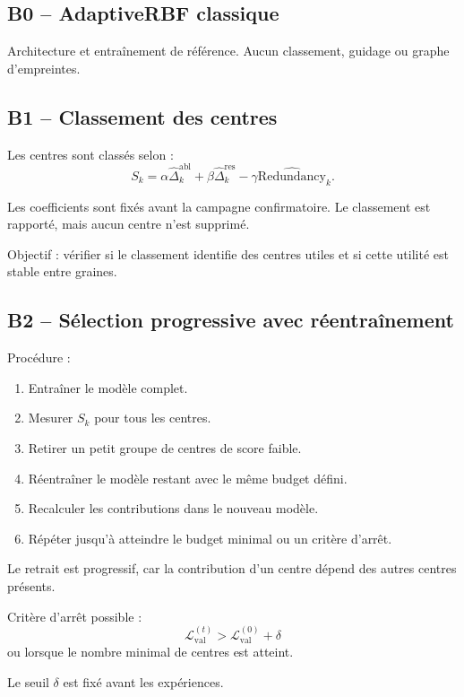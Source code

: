 \documentclass[11pt,a4paper]{article}
\begin{document}
\subsection{B0 -- AdaptiveRBF classique}

Architecture et entraînement de référence.
Aucun classement, guidage ou graphe d'empreintes.

\subsection{B1 -- Classement des centres}

Les centres sont classés selon :
\[
S_k=
\alpha\widehat{\Delta}_k^{\mathrm{abl}}
+\beta\widehat{\Delta}_k^{\mathrm{res}}
-\gamma\widehat{\mathrm{Redundancy}}_k.
\]

Les coefficients sont fixés avant la campagne confirmatoire.
Le classement est rapporté, mais aucun centre n'est supprimé.

Objectif : vérifier si le classement identifie des centres utiles
et si cette utilité est stable entre graines.

\subsection{B2 -- Sélection progressive avec réentraînement}

Procédure :

\begin{enumerate}
  \item Entraîner le modèle complet.
  \item Mesurer \(S_k\) pour tous les centres.
  \item Retirer un petit groupe de centres de score faible.
  \item Réentraîner le modèle restant avec le même budget défini.
  \item Recalculer les contributions dans le nouveau modèle.
  \item Répéter jusqu'à atteindre le budget minimal ou un critère d'arrêt.
\end{enumerate}

Le retrait est progressif, car la contribution d'un centre dépend
des autres centres présents.

Critère d'arrêt possible :
\[
\mathcal{L}_{\mathrm{val}}^{(t)}
>
\mathcal{L}_{\mathrm{val}}^{(0)}+\delta
\]
ou lorsque le nombre minimal de centres est atteint.

Le seuil \(\delta\) est fixé avant les expériences.
\end{document}
